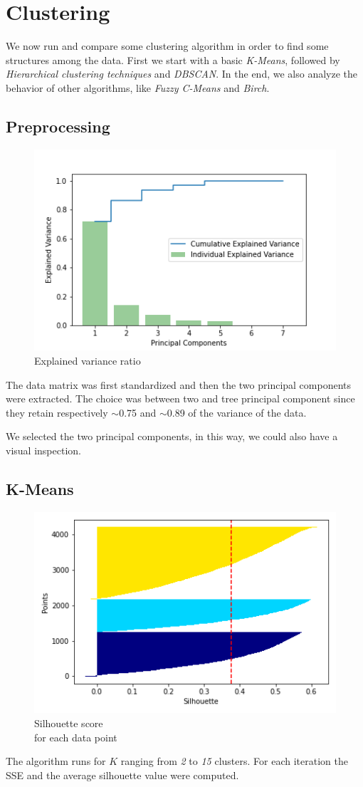 \section{Clustering}
We now run and compare some clustering algorithm in order to find some structures among the data. First we start with a basic \emph{K-Means}, followed by \emph{Hierarchical clustering techniques} and \emph{DBSCAN}. In the end, we also analyze the behavior of other algorithms, like \emph{Fuzzy C-Means} and \emph{Birch}.

\subsection{Preprocessing}

\begin{figure}
\vspace{-20mm}
\centering
\captionsetup{justification=centering}
\includegraphics[width=.35\textwidth]{img/clustering/pca.png}
\caption{Explained variance ratio}
\label{fig:pca_img}
\end{figure}

The data matrix was first standardized and then the two principal components were extracted. The choice was between two and tree principal component since they retain respectively $\sim$0.75 and $\sim$0.89 of the variance of the data.

We selected the two principal components, in this way, we could also have a visual inspection.

\subsection{K-Means}
\begin{figure}
    \vspace{-5mm}	
    \centering
    \captionsetup{justification=centering}
    \includegraphics[width=.3\textwidth]{img/clustering/sil_tot.png}
    \caption{Silhouette score\\ for each data point}
    \label{fig:silhouette}
\end{figure}
The algorithm runs for $K$ ranging from \emph{2} to \emph{15} clusters. For each iteration the SSE and the average silhouette value were computed.

